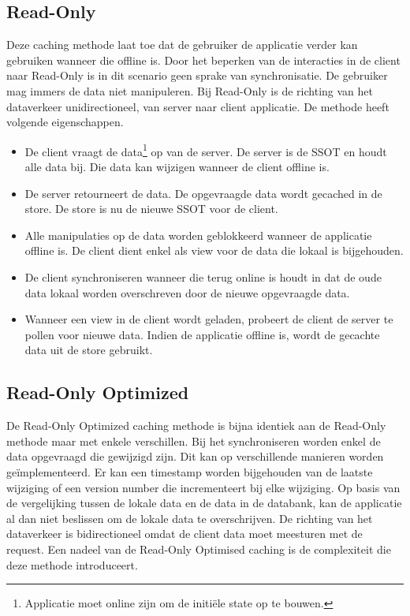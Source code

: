 \subsection{Read-Only}
Deze caching methode laat toe dat de gebruiker de applicatie verder kan gebruiken wanneer die offline is. Door het beperken van de interacties in de client naar Read-Only is in dit scenario geen sprake van synchronisatie. De gebruiker mag immers de data niet manipuleren. Bij Read-Only is de richting van het dataverkeer unidirectioneel, van server naar client applicatie. De methode heeft volgende eigenschappen.
\begin{itemize}
\item De client vraagt de data\footnote{Applicatie moet online zijn om de initi\"ele state op te bouwen.} op van de server. De server is de SSOT en houdt alle data bij. Die data kan wijzigen wanneer de client offline is.
\item De server retourneert de data. De opgevraagde data wordt gecached in de store. De store is nu de nieuwe SSOT voor de client.
\item Alle manipulaties op de data worden geblokkeerd wanneer de applicatie offline is. De client dient enkel als view voor de data die lokaal is bijgehouden.
\item De client synchroniseren wanneer die terug online is houdt in dat de oude data lokaal worden overschreven door de nieuwe opgevraagde data.
\item Wanneer een view in de client wordt geladen, probeert de client de server te pollen voor nieuwe data. Indien de applicatie offline is, wordt de gecachte data uit de store gebruikt.
\end{itemize}

\subsection{Read-Only Optimized}
De Read-Only Optimized caching methode is bijna identiek aan de Read-Only methode maar met enkele verschillen. Bij het synchroniseren worden enkel de data opgevraagd die gewijzigd zijn. Dit kan op verschillende manieren worden ge\"implementeerd. Er kan een timestamp worden bijgehouden van de laatste wijziging of een version number die incrementeert bij elke wijziging. Op basis van de vergelijking tussen de lokale data en de data in de databank, kan de applicatie al dan niet beslissen om de lokale data te overschrijven. De richting van het dataverkeer is bidirectioneel omdat de client data moet meesturen met de request. Een nadeel van de Read-Only Optimised caching is de complexiteit die deze methode introduceert.

